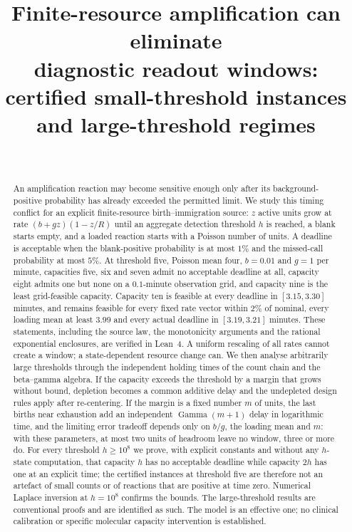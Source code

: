 \documentclass[11pt,a4paper]{article}
\title{Finite-resource amplification can eliminate\\ diagnostic readout windows:\\[4pt]
\large certified small-threshold instances and large-threshold regimes}
\author{\PaperAuthor\\ \small \PaperAffiliation}
\date{\PaperDate}
\theoremstyle{plain}
\theoremstyle{definition}
\theoremstyle{remark}
\DeclareMathOperator{\Gam}{Gamma}
\begin{document}
\maketitle

\begin{abstract}
An amplification reaction may become sensitive enough only after its background-positive probability has already exceeded the permitted limit. We study this timing conflict for an explicit finite-resource birth--immigration source: $z$ active units grow at rate $(b+gz)(1-z/R)$ until an aggregate detection threshold $h$ is reached, a blank starts empty, and a loaded reaction starts with a Poisson number of units. A deadline is acceptable when the blank-positive probability is at most $1\%$ and the missed-call probability at most $5\%$. At threshold five, Poisson mean four, $b=0.01$ and $g=1$ per minute, capacities five, six and seven admit no acceptable deadline at all, capacity eight admits one but none on a $0.1$-minute observation grid, and capacity nine is the least grid-feasible capacity. Capacity ten is feasible at every deadline in $[3.15,3.30]$ minutes, and remains feasible for every fixed rate vector within $2\%$ of nominal, every loading mean at least $3.99$ and every actual deadline in $[3.19,3.21]$ minutes. These statements, including the source law, the monotonicity arguments and the rational exponential enclosures, are verified in Lean~4. A uniform rescaling of all rates cannot create a window; a state-dependent resource change can. We then analyse arbitrarily large thresholds through the independent holding times of the count chain and the beta--gamma algebra. If the capacity exceeds the threshold by a margin that grows without bound, depletion becomes a common additive delay and the undepleted design rules apply after re-centering. If the margin is a fixed number $m$ of units, the last births near exhaustion add an independent $\Gam(m+1)$ delay in logarithmic time, and the limiting error tradeoff depends only on $b/g$, the loading mean and $m$: with these parameters, at most two units of headroom leave no window, three or more do. For every threshold $h\ge10^{8}$ we prove, with explicit constants and without any $h$-state computation, that capacity $h$ has no acceptable deadline while capacity $2h$ has one at an explicit time; the certified instances at threshold five are therefore not an artefact of small counts or of reactions that are positive at time zero. Numerical Laplace inversion at $h=10^{8}$ confirms the bounds. The large-threshold results are conventional proofs and are identified as such. The model is an effective one; no clinical calibration or specific molecular capacity intervention is established.
\end{abstract}
\end{document}

